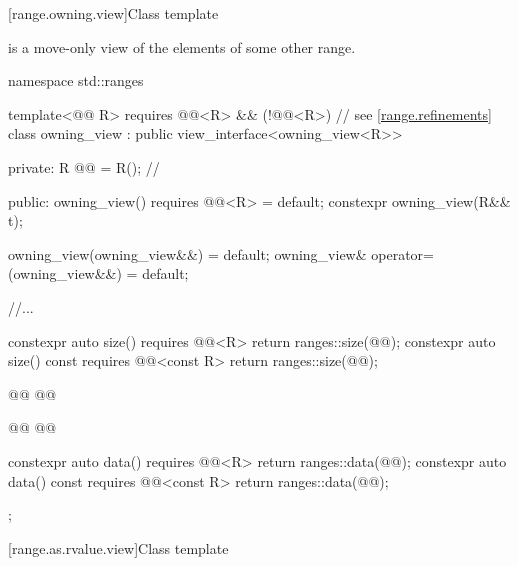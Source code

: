 \documentclass{wg21}
\begin{document}
[range.owning.view]{Class template }

\pnum
{} is a move-only view
of the elements of some other range.
\begin{codeblock}
namespace std::ranges {
template<@@ R>
requires @@<R> && (!@@<R>) // see \ref{range.refinements}
class owning_view : public view_interface<owning_view<R>> {
    private:
    R @@ = R();         // \expos

    public:
    owning_view() requires @@<R> = default;
    constexpr owning_view(R&& t);

    owning_view(owning_view&&) = default;
    owning_view& operator=(owning_view&&) = default;

    //...

    constexpr auto size() requires @@<R>
    { return ranges::size(@@); }
    constexpr auto size() const requires @@<const R>
    { return ranges::size(@@); }

    @@
    @@

    @@
    @@

    constexpr auto data() requires @@<R>
    { return ranges::data(@@); }
    constexpr auto data() const requires @@<const R>
    { return ranges::data(@@); }
};
}
\end{codeblock}

[range.as.rvalue.view]{Class template }
\end{document}
